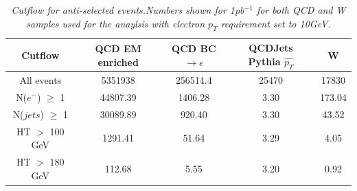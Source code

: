 \begin{table}[h!]
\begin{center}
\begin{tabular}{|c||c|c|c|c|}
\hline
Cutflow & QCD EM enriched & QCD BC$\rightarrow e$ & QCDJets Pythia $\hat{p_{T}}$ &  W \\
\hline
All events & 5351938 & 256514.4 & 25470 & 17830\\
N($e^{-}$) $\geq$ 1 & 44807.39 & 1406.28 & 3.30 & 173.04\\
N($jets$) $\geq$ 1 & 30089.89 & 920.40 & 3.30 & 43.52\\
HT $>$ 100 GeV & 1291.41 & 51.64 & 3.29 & 4.05\\
HT $>$ 180 GeV & 112.68 & 5.55 & 3.20 &  0.92\\
\hline
\end{tabular}
\end{center}
\caption{\textit{Cutflow for anti-selected events.Numbers shown for 1pb$^{-1}$ for both QCD and W samples used for the anaylsis with electron $p_{T}$ requirement set to 10GeV.}}
\label{tab:CF_AS_10}
\end{table}

